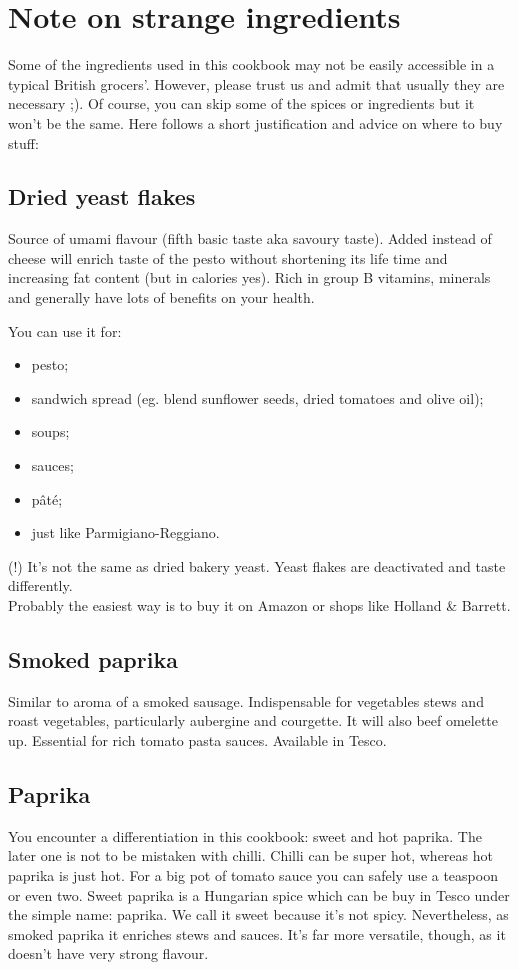 \section*{Note on strange ingredients}

Some of the ingredients used in this cookbook may not be easily accessible in a typical British grocers'. However, please trust us and admit that usually they are necessary ;). Of course, you can skip some of the spices or ingredients but it won't be the same. Here follows a short justification and advice on where to buy stuff: 

\subsection*{Dried yeast flakes}

Source of umami flavour (fifth basic taste aka savoury taste). Added instead of cheese will enrich taste of the pesto without shortening its life time and increasing fat content (but in calories yes). Rich in group B vitamins, minerals and generally have lots of benefits on your health. 

You can use it for:

\begin{itemize}
    \setlength\itemsep{0.1mm}
    \item pesto;
    \item sandwich spread (eg. blend sunflower seeds, dried tomatoes and olive oil);
    \item soups;
    \item sauces; 
    \item pâté;
    \item just like Parmigiano-Reggiano.
\end{itemize}

(!) It's not the same as dried bakery yeast.
Yeast flakes are deactivated and taste differently.
\\
Probably the easiest way is to buy it on Amazon or shops like Holland \& Barrett.

\subsection* {Smoked paprika}
Similar to aroma of a smoked sausage.
Indispensable for vegetables stews and roast vegetables, particularly aubergine and courgette.
It will also beef omelette up. 
Essential for rich tomato pasta sauces.
Available in Tesco. 

\subsection*{Paprika}
You encounter a differentiation in this cookbook: sweet and hot paprika.
The later one is not to be mistaken with chilli.
Chilli can be super hot, whereas hot paprika is just hot.
For a big pot of tomato sauce you can safely use a teaspoon or even two.
Sweet paprika is a Hungarian spice which can be buy in Tesco under the simple name: paprika.
We call it sweet because it's not spicy.
Nevertheless, as smoked paprika it enriches stews and sauces.
It's far more versatile, though, as it doesn't have very strong flavour.

